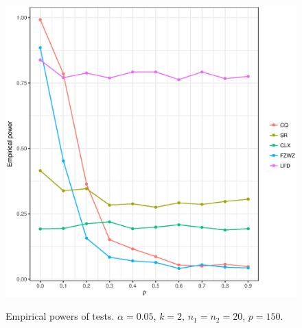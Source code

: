 \documentclass[12pt]{article} %
\theoremstyle{definition}
\begin{document}
\begin{figure}[htbp]
    \centering
    \includegraphics[width=12cm,height=12cm]{figure1}
    \caption{Empirical powers of tests. $\alpha=0.05$, $k=2$, $n_1=n_2=20$, $p=150$.}\label{figure1}
\end{figure}
\end{document}
